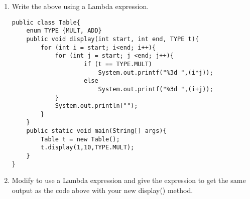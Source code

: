 \documentclass{article}
\begin{document}
\begin{enumerate}
\begin{lstlisting}
 	}
}
\end{lstlisting}
	\item Write the above using a Lambda expression.
\newpage
\begin{lstlisting}
public class Table{
 	enum TYPE {MULT, ADD}
 	public void display(int start, int end, TYPE t){
  		for (int i = start; i<end; i++){
   			for (int j = start; j <end; j++){
    				if (t == TYPE.MULT)
     					System.out.printf("%3d ",(i*j));
    				else 
     					System.out.printf("%3d ",(i+j));
   			}
   			System.out.println("");
  		}
 	}
 	public static void main(String[] args){
  		Table t = new Table();
  		t.display(1,10,TYPE.MULT);
 	}
}
\end{lstlisting}
	\item Modify to use a Lambda expression and give the expression to get the same output as the code above with your new display() method.
\end{enumerate}
\end{document}
